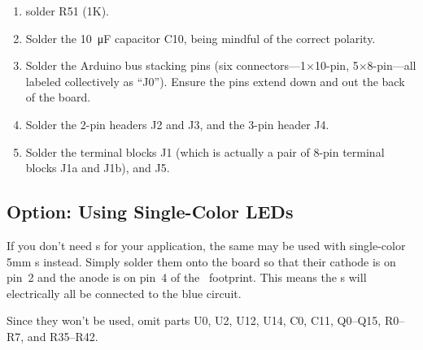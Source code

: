 \begin{enumerate}
\begin{itemize}
			\item D513: amber\footnote{In deference to the effort my high school drama teacher went through to get us to refer to any yellow stage lights and gels as ``amber'' and the
				preference to using ``amber'' for signal lamp colors in other contexts and regions, both terms will be used interchangeably in this project.} (with R25=360$\Omega$)
			\item D514: amber (with R26=360$\Omega$)
			\item D515: red (with R27=360$\Omega$)
			\item D516: red (with R28=360$\Omega$)
			\item D517: blue (with R29=300$\Omega$)
			\item D518: blue (with R30=300$\Omega$)
			\item D519 (top): white (with R31=300$\Omega$)
		\end{itemize}
	\item {} solder R51 (1K).
	\item {} Solder the \SI{10}{\micro\farad} capacitor C10, being mindful of the correct polarity. 
	\item Solder the Arduino bus stacking pins (six connectors---1$\times$10-pin, 5$\times$8-pin---all labeled collectively as ``J0'').
		Ensure the pins extend down and out the back of the board.
	\item Solder the 2-pin headers J2 and J3, and the 3-pin header J4.
	\item Solder the terminal blocks J1 (which is actually a pair of 8-pin terminal blocks J1a and J1b), and J5.
\end{enumerate}


\subsection{Option: Using Single-Color LEDs}
If you don't need  \led s for your application, the same 
may be used with single-color 5mm \led s instead. Simply solder them onto the board so
that their cathode is on pin~2 and the anode is on pin~4 of the \led\ footprint. This
means the \led s will electrically all be connected to the blue circuit. 

Since they won't be used, omit parts U0, U2, U12, U14, C0, C11, Q0--Q15, R0--R7, and R35--R42.

